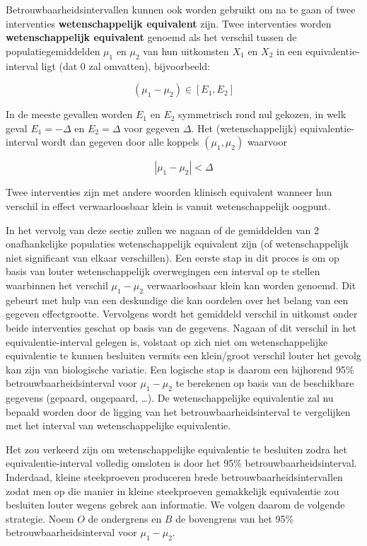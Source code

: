 \documentclass[
  dutch,
  letterpaper,
  12pt]{book}
\theoremstyle{definition}
\theoremstyle{definition}
\theoremstyle{definition}
\theoremstyle{remark}
\begin{document}
Betrouwbaarheidsintervallen kunnen ook worden gebruikt om na te gaan of
twee interventies \textbf{wetenschappelijk equivalent} zijn. Twee
interventies worden \textbf{wetenschappelijk equivalent} genoemd als het
verschil tussen de populatiegemiddelden \(\mu_1\) en \(\mu_2\) van hun
uitkomsten \(X_1\) en \(X_2\) in een equivalentie-interval ligt (dat 0
zal omvatten), bijvoorbeeld:

\begin{equation*}
(\mu_1 - \mu_2) \in [E_1, E_2]
\end{equation*}

In de meeste gevallen worden \(E_1\) en \(E_2\) symmetrisch rond nul
gekozen, in welk geval \(E_1=-\Delta\) en \(E_2=\Delta\) voor gegeven
\(\Delta\). Het (wetenschappelijk) equivalentie-interval wordt dan
gegeven door alle koppels \((\mu_1,\mu_2)\) waarvoor

\begin{equation*}
|\mu_1 - \mu_2| < \Delta
\end{equation*}

Twee interventies zijn met andere woorden klinisch equivalent wanneer
hun verschil in effect verwaarloosbaar klein is vanuit wetenschappelijk
oogpunt.

In het vervolg van deze sectie zullen we nagaan of de gemiddelden van 2
onafhankelijke populaties wetenschappelijk equivalent zijn (of
wetenschappelijk niet significant van elkaar verschillen). Een eerste
stap in dit proces is om op basis van louter wetenschappelijk
overwegingen een interval op te stellen waarbinnen het verschil
\(\mu_1-\mu_2\) verwaarloosbaar klein kan worden genoemd. Dit gebeurt
met hulp van een deskundige die kan oordelen over het belang van een
gegeven effectgrootte. Vervolgens wordt het gemiddeld verschil in
uitkomst onder beide interventies geschat op basis van de gegevens.
Nagaan of dit verschil in het equivalentie-interval gelegen is, volstaat
op zich niet om wetenschappelijke equivalentie te kunnen besluiten
vermits een klein/groot verschil louter het gevolg kan zijn van
biologische variatie. Een logische stap is daarom een bijhorend 95\%
betrouwbaarheidsinterval voor \(\mu_1 - \mu_2\) te berekenen op basis
van de beschikbare gegevens (gepaard, ongepaard, \ldots). De
wetenschappelijke equivalentie zal nu bepaald worden door de ligging van
het betrouwbaarheidsinterval te vergelijken met het interval van
wetenschappelijke equivalentie.

Het zou verkeerd zijn om wetenschappelijke equivalentie te besluiten
zodra het equivalentie-interval volledig omsloten is door het 95\%
betrouwbaarheidsinterval. Inderdaad, kleine steekproeven produceren
brede betrouwbaarheidsintervallen zodat men op die manier in kleine
steekproeven gemakkelijk equivalentie zou besluiten louter wegens gebrek
aan informatie. We volgen daarom de volgende strategie. Noem \(O\) de
ondergrens en \(B\) de bovengrens van het 95\% betrouwbaarheidsinterval
voor \(\mu_1-\mu_2\).
\end{document}
